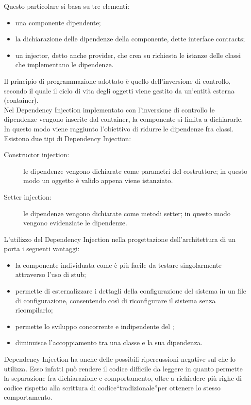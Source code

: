 Questo particolare  si basa su tre elementi:
\begin{itemize}
\item una componente dipendente;
\item la dichiarazione delle dipendenze della componente, dette interface contracts;
\item un injector, detto anche provider, che crea su richiesta le istanze delle classi che implementano le dipendenze.
\end{itemize}
Il principio di programmazione adottato è quello dell'inversione di controllo, secondo il quale il ciclo di vita degli oggetti viene gestito da un'entità esterna (container).\\
Nel Dependency Injection implementato con l'inversione di controllo le dipendenze vengono inserite dal container, la componente si limita a dichiararle. In questo modo viene raggiunto l'obiettivo di ridurre le dipendenze fra classi.\\
Esistono due tipi di Dependency Injection:
\begin{description}
	\item[Constructor injection:] le dipendenze vengono dichiarate come parametri del costruttore; in questo modo un oggetto è valido appena viene istanziato.
	\item[Setter injection:] le dipendenze vengono dichiarate come metodi setter; in questo modo vengono evidenziate le dipendenze.
\end{description}

L'utilizzo del  Dependency Injection nella progettazione dell'architettura di un  porta i seguenti vantaggi:
\begin{itemize}
\item la componente individuata come  è più facile da testare singolarmente attraverso l'uso di stub;
\item permette di esternalizzare i dettagli della configurazione del sistema in un file di configurazione, consentendo così di riconfigurare il sistema senza ricompilarlo;
\item permette lo sviluppo concorrente e indipendente del ;
\item diminuisce l'accoppiamento tra una classe e la sua dipendenza.
\end{itemize}
Dependency Injection ha anche delle possibili ripercussioni negative sul  che lo utilizza. Esso infatti può rendere il codice difficile da leggere in quanto permette la separazione fra dichiarazione e comportamento, oltre a richiedere più righe di codice rispetto alla scrittura di codice“tradizionale”per ottenere lo stesso comportamento.

